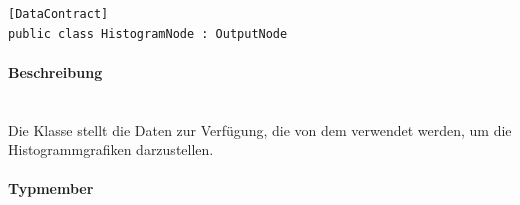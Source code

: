 \begin{verbatim}
[DataContract]
public class HistogramNode : OutputNode
\end{verbatim}
\paragraph{Beschreibung}~\\
Die Klasse  stellt die Daten zur Verfügung, die von dem  verwendet werden, um die Histogrammgrafiken darzustellen. %

\paragraph{Typmember}
